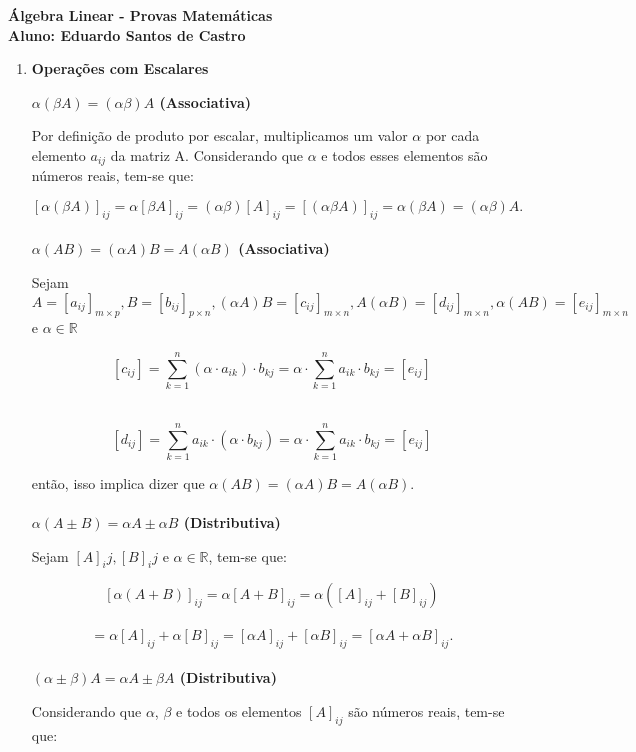 \documentclass[a4paper, 12pt]{article}
\begin{document}
\begin{center}
\textbf{Álgebra Linear - Provas Matemáticas \\ Aluno: Eduardo Santos de Castro}
\end{center}

\begin{enumerate}
\item \textbf{Operações com Escalares}

\textbf{$\alpha(\beta A) = (\alpha \beta) A$ (Associativa)}

Por definição de produto por escalar, multiplicamos um valor $\alpha$ por cada elemento $a_{ij}$ da matriz A. Considerando que $\alpha$ e todos esses elementos são números reais, tem-se que:

$$
[\alpha(\beta A)]_{ij} 
= \alpha [\beta A]_{ij}
= (\alpha \beta)[A]_{ij}
= [(\alpha \beta A)]_{ij}
= \alpha (\beta A) = (\alpha \beta) A.
$$ \\


\textbf{$\alpha (A B) = (\alpha A) B = A (\alpha B)$ (Associativa)} 

Sejam $
A=[a_{ij}]_{m \times p}, 
B=[b_{ij}]_{p \times n}, 
(\alpha A)B=[c_{ij}]_{m \times n}, 
A (\alpha B)=[d_{ij}]_{m \times n}, 
\alpha (AB)=[e_{ij}]_{m \times n}$ 
e $\alpha \in \mathbb{R}$

$$
[c_{ij}] 
= \sum\limits_{k=1}^{n}(\alpha \cdot a_{ik}) \cdot b_{kj}
= \alpha \cdot \sum\limits_{k=1}^{n} a_{ik} \cdot b_{kj}
= [e_{ij}]
$$ \

$$
[d_{ij}] 
= \sum\limits_{k=1}^{n}a_{ik} \cdot(\alpha \cdot b_{kj})
= \alpha \cdot \sum\limits_{k=1}^{n} a_{ik} \cdot b_{kj}
= [e_{ij}]
$$

então, isso implica dizer que $\alpha (A B) = (\alpha A) B = A (\alpha B)$. \\ \\


\textbf{$\alpha (A \pm B) = \alpha A \pm \alpha B$ (Distributiva)}

Sejam $[A]_ij, [B]_ij$ e $\alpha \in \mathbb{R}$, tem-se que:

$$
[\alpha (A + B)]_{ij} 
= \alpha[A + B]_{ij}
= \alpha([A]_{ij} + [B]_{ij}) $$ \ $$
= \alpha [A]_{ij} + \alpha [B]_{ij}
= [\alpha A]_{ij} + [\alpha B]_{ij}
= [\alpha A + \alpha B]_{ij}.
$$ \\


\textbf{$(\alpha \pm \beta) A = \alpha A \pm \beta A$ (Distributiva)}

Considerando que $\alpha$, $\beta$ e todos os elementos $[A]_{ij}$ são números reais, tem-se que:


\end{enumerate}
\end{document}
